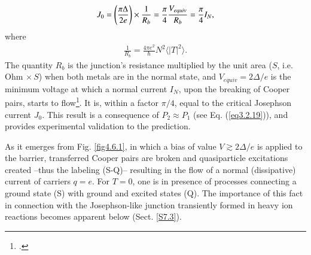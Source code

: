 \begin{align}\label{eq4.7.20}
J_0=\left(\frac{\pi\Delta}{2e}\right)\times\frac{1}{R_b}=\frac{\pi}{4}\frac{V_{equiv}}{R_b}=\frac{\pi}{4}I_N, \idx{Josephson effect!equivalent potential} \idx{Josephson effect!critical current}
\end{align}
where
\begin{align}\label{eq4.7.21}
\frac{1}{R_b}=\frac{4\pi e^2}{\hbar}N^2\langle|T|^2\rangle.
\end{align}
The quantity  $R_b$ 
 is the  junction's resistance  multiplied by the   unit area ($S$, i.e. Ohm $\times\, S$)  when both metals are in the normal state, and $V_{equiv}=2\Delta/e$ is the minimum voltage at which a normal current $I_N$, upon the breaking of Cooper pairs, starts to flow\footnote{\cite{Giaver:73}.}. It is, within a factor $\pi/4$,  equal to the critical Josephson current $J_0$. This result is a consequence of  $P_2\approx P_1$ (see Eq. (\ref{eq3.2.19})), and provides experimental validation to the prediction.
  
  

  
As it emerges from Fig. \ref{fig4.6.1}, in which a bias of value $V\gtrsim2\Delta/e$ is applied to the barrier, transferred Cooper pairs are broken and quasiparticle excitations created --thus the labeling (S-Q)-- resulting in the flow of a normal (dissipative) current of carriers $q=e$. For $T=0$, one is in presence of processes connecting a ground state (S) with ground and excited states (Q). The importance of this fact in connection with the Josephson-like junction transiently formed in heavy ion reactions becomes apparent below (Sect. \ref{S7.3}).
  

